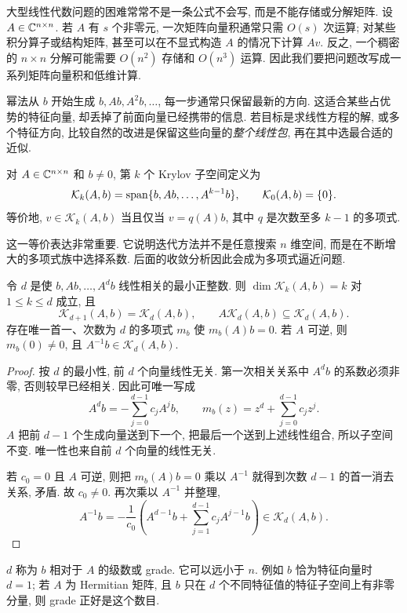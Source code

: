 \label{ch:krylov}
大型线性代数问题的困难常常不是一条公式不会写, 而是不能存储或分解矩阵. 设 $A\in\mathbb C^{n\times n}$. 若 $A$ 有 $s$ 个非零元, 一次矩阵向量积通常只需 $O(s)$ 次运算; 对某些积分算子或结构矩阵, 甚至可以在不显式构造 $A$ 的情况下计算 $Av$. 反之, 一个稠密的 $n\times n$ 分解可能需要 $O(n^2)$ 存储和 $O(n^3)$ 运算. 因此我们要把问题改写成一系列矩阵向量积和低维计算.

幂法从 $b$ 开始生成 $b,Ab,A^2b,\ldots$, 每一步通常只保留最新的方向. 这适合某些占优势的特征向量, 却丢掉了前面向量已经携带的信息. 若目标是求线性方程的解, 或多个特征方向, 比较自然的改进是保留这些向量的\emph{整个线性包}, 再在其中选最合适的近似.

\begin{definition}
对 $A\in\mathbb C^{n\times n}$ 和 $b\ne0$, 第 $k$ 个 Krylov 子空间定义为
\[
\mathcal K_k(A,b)=\operatorname{span}\{b,Ab,\ldots,A^{k-1}b\},\qquad \mathcal K_0(A,b)=\{0\}.
\]
等价地, $v\in\mathcal K_k(A,b)$ 当且仅当 $v=q(A)b$, 其中 $q$ 是次数至多 $k-1$ 的多项式.
\end{definition}
这一等价表达非常重要. 它说明迭代方法并不是任意搜索 $n$ 维空间, 而是在不断增大的多项式族中选择系数. 后面的收敛分析因此会成为多项式逼近问题.

\begin{proposition}\label{prop:krylov-grade}
令 $d$ 是使 $b,Ab,\ldots,A^db$ 线性相关的最小正整数. 则 $\dim\mathcal K_k(A,b)=k$ 对 $1\le k\le d$ 成立, 且
\[
\mathcal K_{d+1}(A,b)=\mathcal K_d(A,b),\qquad
A\mathcal K_d(A,b)\subseteq\mathcal K_d(A,b).
\]
存在唯一首一、次数为 $d$ 的多项式 $m_b$ 使 $m_b(A)b=0$. 若 $A$ 可逆, 则 $m_b(0)\ne0$, 且 $A^{-1}b\in\mathcal K_d(A,b)$.
\end{proposition}
\begin{proof}
按 $d$ 的最小性, 前 $d$ 个向量线性无关. 第一次相关关系中 $A^db$ 的系数必须非零, 否则较早已经相关. 因此可唯一写成
\[
A^db=-\sum_{j=0}^{d-1}c_jA^jb,
\qquad m_b(z)=z^d+\sum_{j=0}^{d-1}c_jz^j.
\]
$A$ 把前 $d-1$ 个生成向量送到下一个, 把最后一个送到上述线性组合, 所以子空间不变. 唯一性也来自前 $d$ 个向量的线性无关.

若 $c_0=0$ 且 $A$ 可逆, 则把 $m_b(A)b=0$ 乘以 $A^{-1}$ 就得到次数 $d-1$ 的首一消去关系, 矛盾. 故 $c_0\ne0$. 再次乘以 $A^{-1}$ 并整理,
\[
A^{-1}b=-\frac1{c_0}\left(A^{d-1}b+\sum_{j=1}^{d-1}c_jA^{j-1}b\right)
\in\mathcal K_d(A,b).
\]
\end{proof}
$d$ 称为 $b$ 相对于 $A$ 的级数或 grade. 它可以远小于 $n$. 例如 $b$ 恰为特征向量时 $d=1$; 若 $A$ 为 Hermitian 矩阵, 且 $b$ 只在 $d$ 个不同特征值的特征子空间上有非零分量, 则 grade 正好是这个数目.

